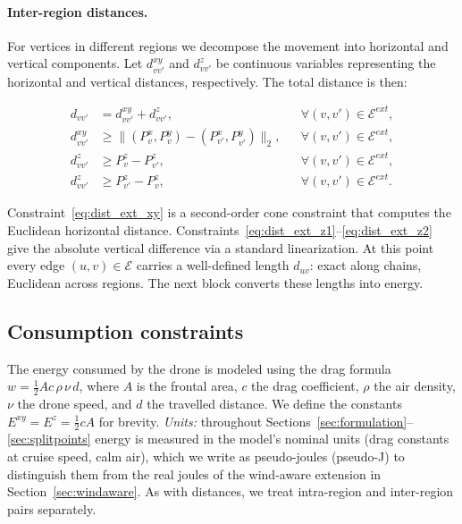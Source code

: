 \documentclass[12pt]{elsarticle}
\begin{document}
\paragraph{Inter-region distances.}
For vertices in different regions we decompose the movement into horizontal and vertical components. Let $d_{vv'}^{xy}$ and $d_{vv'}^z$ be continuous variables representing the horizontal and vertical distances, respectively. The total distance is then:

\begin{align}
    d_{vv'} &= d_{vv'}^{xy} + d_{vv'}^z,
            && \forall (v,v')\in\mathcal E^{ext},
            \label{eq:dist_ext_sum}\tag{Dist-C$_4$}\\
    d_{vv'}^{xy} &\ge \bigl\| (P_v^x,P_v^y) - (P_{v'}^x,P_{v'}^y) \bigr\|_2,
            && \forall (v,v')\in\mathcal E^{ext},
            \label{eq:dist_ext_xy}\tag{Dist-C$_5$}\\
    d_{vv'}^z &\ge P_v^z - P_{v'}^z,
            && \forall (v,v')\in\mathcal E^{ext},
            \label{eq:dist_ext_z1}\tag{Dist-C$_6$}\\
    d_{vv'}^z &\ge P_{v'}^z - P_v^z,
            && \forall (v,v')\in\mathcal E^{ext}.
            \label{eq:dist_ext_z2}\tag{Dist-C$_7$}
\end{align}

Constraint~\eqref{eq:dist_ext_xy} is a second-order cone constraint that computes the Euclidean horizontal distance. Constraints~\eqref{eq:dist_ext_z1}--\eqref{eq:dist_ext_z2} give the absolute vertical difference via a standard linearization. At this point every edge $(u,v)\in\mathcal E$ carries a well-defined length $d_{uv}$: exact along chains, Euclidean across regions. The next block converts these lengths into energy.


\subsection{Consumption constraints}

The energy consumed by the drone is modeled using the drag formula $w = \tfrac12 A c\,\rho\,\nu\,d$, where $A$ is the frontal area, $c$ the drag coefficient, $\rho$ the air density, $\nu$ the drone speed, and $d$ the travelled distance. We define the constants $E^{xy}=E^{z}=\tfrac12 cA$ for brevity. \emph{Units:} throughout Sections~\ref{sec:formulation}--\ref{sec:splitpoints} energy is measured in the model's nominal units (drag constants at cruise speed, calm air), which we write as pseudo-joules (pseudo-J) to distinguish them from the real joules of the wind-aware extension in Section~\ref{sec:windaware}. As with distances, we treat intra-region and inter-region pairs separately.
\end{document}
